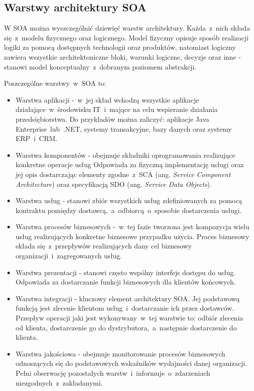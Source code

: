 \subsection{Warstwy architektury SOA}
W SOA można wyszczególnić dziewięć warstw architektury. Każda~z~nich składa się~z~modelu fizycznego oraz logicznego. Model fizyczny opisuje sposób realizacji logiki za pomocą dostępnych technologii oraz produktów, natomiast logiczny zawiera wszystkie architektoniczne bloki, warunki logiczne, decyzje oraz inne - stanowi model konceptualny~z~dobranym poziomem abstrakcji.

Poszczególne warstwy~w~SOA to:
\begin{itemize}
\item{Warstwa aplikacji -~w~jej skład wchodzą wszystkie aplikacje działające~w~środowisku IT~i~mające na celu wspieranie działania przedsiębiorstwa. Do przykładów można zaliczyć: aplikacje Java Enterprise~lub~.NET, systemy transakcyjne, bazy danych oraz systemy ERP~i~CRM.}
\item{Warstwa komponentów - obejmuje składniki oprogramowania realizujące konkretne operacje usług Odpowiada za fizyczną implementację usługi oraz jej opis dostarczając elementy zgodne~z~SCA (ang. \textit{Service Component Architecture}) oraz specyfikacją SDO (ang. \textit{Service Data Objects}).}
\item{Warstwa usług - stanowi zbiór wszystkich usług zdefiniowanych za pomocą kontraktu pomiędzy dostawcą,~a~odbiorcą~o~sposobie dostarczenia usługi.}
\item{Warstwa procesów biznesowych -~w~tej fazie tworzona jest kompozycja wielu usług realizujących konkretne biznesowe przypadku użycia. Proces biznesowy składa się~z~przepływów realizujących dany cel biznesowy organizacji~i~zagregowanych usług.}
\item{Warstwa prezentacji - stanowi często wspólny interfejs dostępu do usług. Odpowiada za dostarczanie funkcji biznesowych dla klientów końcowych.}
\item{Warstwa integracji - kluczowy element architektury SOA. Jej podstawową funkcją jest zlecenie klientom usług~i~dostarczanie ich przez dostawców. Przepływ operacji jaki jest wykonywany~w~tej warstwie to: odbiór zlecenia od klienta, dostarczenie go do dystrybutora,~a~następnie dostarczenie do klienta.}
\item{Warstwa jakościowa - obejmuje monitorowanie procesów biznesowych odnoszących się do podstawowych wskaźników wydajności danej organizacji. Pełni obserwację pozostałych warstw~i~informuje~o~zdarzeniach niezgodnych~z~zakładanymi.}

\end{itemize}
